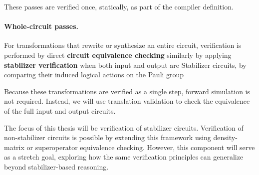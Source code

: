 These passes are verified once, statically, as part of the compiler definition.

\paragraph{Whole-circuit passes.}
For transformations that rewrite or synthesize an entire circuit, verification is performed by direct \textbf{circuit equivalence checking} similarly by applying \textbf{stabilizer verification} when both input and output are Stabilizer circuits, by comparing their induced logical actions on the Pauli group

Because these transformations are verified as a single step, forward simulation is not required.  
Instead, we will use translation validation to check the equivalence of the full input and output circuits. 

\vspace{2em}

The focus of this thesis will be verification of stabilizer circuits. Verification of non-stabilizer circuits is possible by extending this framework using density-matrix or superoperator equivalence checking. However, this component will serve as a stretch goal, exploring how the same verification principles can generalize beyond stabilizer-based reasoning.
